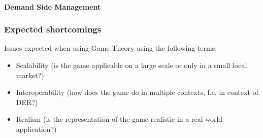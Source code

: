 \paragraph{Demand Side Management}


\subsubsection{Expected shortcomings}

Issues expected when using Game Theory using the following terms:
\begin{itemize}
	\item Scalability (is the game applicable on a large scale or only in a small local market?)
	\item Interoperability (how does the game do in multiple contexts, f.e. in context of DER?)
	\item Realism (is the representation of the game realistic in a real world application?)
\end{itemize}
